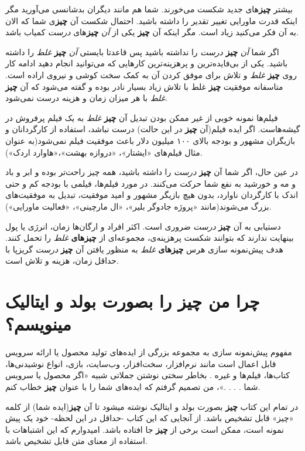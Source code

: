 بیشتر \textbf{چیز}های جدید شکست می‌خورند. شما هم مانند دیگران بدشانسی
می‌آورید مگر اینکه قدرت ماورایی تغییر تقدیر را داشته باشید. احتمال شکست
آن \textbf{چیز}ی شما که الان به آن فکر می‌کنید زیاد است. مگر اینکه آن
\textbf{چیز} یکی از \emph{آن} \textbf{چیز}های \emph{درست} کمیاب باشد.

اگر شما \emph{آن} \textbf{چیز} \emph{درست} را نداشته باشید پس قاعدتا
بایستی \emph{آن} \textbf{چیز} \emph{غلط} را داشته باشید. یکی از
بی‌فایده‌ترین و پرهزینه‌ترین کارهایی که می‌توانید انجام دهید ادامه کار
روی \textbf{چیز} \emph{غلط} و تلاش برای موفق کردن آن به کمک سخت کوشی و
نیروی اراده است. متاسفانه موفقیت \textbf{چیز} غلط با تلاش زیاد بسیار
نادر بوده و گفته می‌شود که آن \textbf{چیز} \emph{غلط} با هر میزان زمان و
هزینه درست نمی‌شود.

فیلم‌ها نمونه خوبی از غیر ممکن بودن تبدیل آن \textbf{چیز} \emph{غلط} به
یک فیلم پرفروش در گیشه‌هاست. اگر ایده فیلم(آن \textbf{چیز} در این حالت)
درست نباشد، استفاده از کارگردانان و بازیگران مشهور و بودجه بالای ۱۰۰
میلیون دلار باعث موفقیت فیلم نمی‌شود(به عنوان مثال فیلم‌های «ایشتار»،
«دروازه بهشت»،«هاوارد اردک»).

در عین حال، اگر شما آن \textbf{چیز} \emph{درست} را داشته باشید، همه چیز
راحت‌تر بوده و ابر و باد و مه و خورشید به نفع شما حرکت می‌کنند. در مورد
فیلم‌ها، فیلمی با بودجه کم و حتی اندک با کارگردان ناوارد، بدون هیچ
بازیگر مشهور و امید موفقیت، تبدیل به موفقیت‌های بزرگ می‌شوند(مانند
«پروژه جادوگر بلیر»، «ال مارچینی»، «فعالیت ماورایی»).

دستیابی به آن \textbf{چیز} \emph{درست} ضروری است. اکثر افراد و ارگان‌ها
زمان، انرژی یا پول بینهایت ندارند که بتوانند شکست پرهزینه‌ی، مجموعه‌ای
از \textbf{چیزهای} \emph{غلط} را تحمل کنند. هدف پیش‌نمونه سازی هرس
\textbf{چیزهای} \emph{غلط} به منظور یافتن آن \textbf{چیز} \emph{درست}
گریزپا با حداقل زمان، هزینه و تلاش است.

\section{\texorpdfstring{چرا من \textbf{چیز} را بصورت بولد و ایتالیک
مینویسم؟}{چرا من چیز را بصورت بولد و ایتالیک مینویسم؟}}\label{ux686ux631ux627-ux645ux646-ux686ux6ccux632-ux631ux627-ux628ux635ux648ux631ux62a-ux628ux648ux644ux62f-ux648-ux627ux6ccux62aux627ux644ux6ccux6a9-ux645ux6ccux646ux648ux6ccux633ux645}

مفهوم پیش‌نمونه سازی به مجموعه بزرگی از ایده‌های تولید محصول یا ارائه
سرویس قابل اعمال است مانند نرم‌افزار، سخت‌افزار، وب‌سایت، بازی، انواع
نوشیدنی‌ها، کتاب‌ها، فیلم‌ها و غیره . بخاطر سختی نوشتن جملاتی شبیه «اگر
محصول یا سرویس شما . . . .»، من تصمیم گرفتم که ایده‌های شما را با عنوان
\textbf{چیز} خطاب کنم.

در تمام این کتاب \textbf{چیز} بصورت بولد و ایتالیک نوشته میشود تا آن
\textbf{چیز}(ایده شما) از کلمه «چیز» قابل تشخیص باشد. از آنجایی که این
کتاب -حداقل در این لحظه- خود یک پیش نمونه است، ممکن است برخی از
\textbf{چیز} جا افتاده باشد. امیدوارم که این اشتباهات با استفاده از
معنای متن قابل تشخیص باشد.

